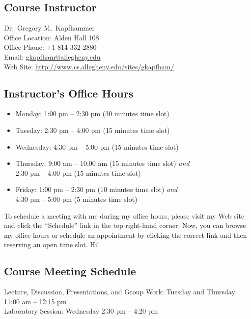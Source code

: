 



\subsection*{Course Instructor}
Dr.\ Gregory M.\ Kapfhammer \\  
\noindent Office Location: Alden Hall 108 \\
\noindent Office Phone: +1 814-332-2880 \\
\noindent Email: \url{gkapfham@allegheny.edu} \\
\noindent Web Site: \url{http://www.cs.allegheny.edu/sites/gkapfham/}

\subsection*{Instructor's Office Hours}

\begin{itemize}
	\itemsep 0em
	\item Monday: 1:00 pm -- 2:30 pm (30 minutes time slot)
	\item Tuesday: 2:30 pm -- 4:00 pm (15 minutes time slot)
	\item Wednesday: 4:30 pm -- 5:00 pm (15 minutes time slot)
	\item Thursday: 9:00 am -- 10:00 am (15 minutes time slot) {\em and} \\ \hspace*{.69in} 2:30 pm -- 4:00 pm (15 minutes time slot)
	\item Friday: 1:00 pm -- 2:30 pm (10 minutes time slot) {\em and} \\ \hspace*{.49in} 4:30 pm -- 5:00 pm (5 minutes time slot)
\end{itemize}

\noindent
To schedule a meeting with me during my office hours, please visit my Web site and click the ``Schedule'' link in the
top right-hand corner. Now, you can browse my office hours or schedule an appointment by clicking the correct link and
then reserving an open time slot. Hi!

\subsection*{Course Meeting Schedule}

Lecture, Discussion, Presentations, and Group Work: Tuesday and Thursday 11:00 am -- 12:15 pm \\
Laboratory Session: Wednesday 2:30 pm -- 4:20 pm

